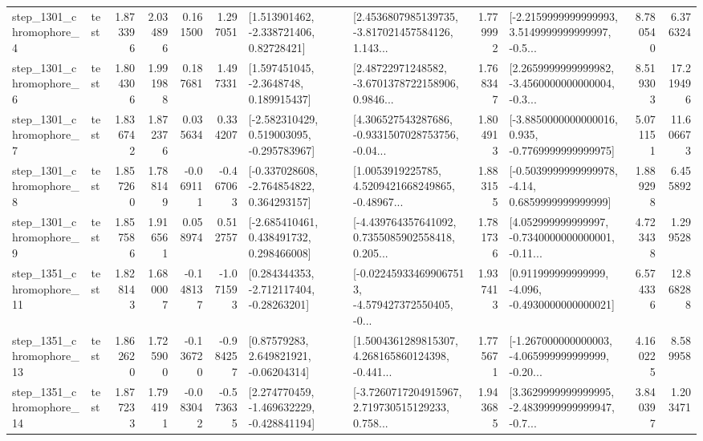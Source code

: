 \begin{tabular}{llrrrrllrlrr}
  step\_1301\_chromophore\_4 &      test &      1.873396 &    2.034896 &      0.161500 &  1.297051 &     [1.513901462, -2.338721406, 0.82728421] &  [2.4536807985139735, -3.817021457584126, 1.143... &       1.779992 &  [-2.2159999999999993, 3.5149999999999997, -0.5... &            8.780540 &          6.376324 \\
  step\_1301\_chromophore\_6 &      test &      1.804306 &    1.991988 &      0.187681 &  1.497331 &      [1.597451045, -2.3648748, 0.189915437] &  [2.48722971248582, -3.6701378722158906, 0.9846... &       1.768347 &  [2.2659999999999982, -3.4560000000000004, -0.3... &            8.519303 &         17.219496 \\
  step\_1301\_chromophore\_7 &      test &      1.836742 &    1.872376 &      0.035634 &  0.334207 &   [-2.582310429, 0.519003095, -0.295783967] &  [4.306527543287686, -0.9331507028753756, -0.04... &       1.804913 &  [-3.8850000000000016, 0.935, -0.7769999999999975] &            5.071151 &         11.606673 \\
  step\_1301\_chromophore\_8 &      test &      1.857260 &    1.788149 &     -0.069111 & -0.467063 &   [-0.337028608, -2.764854822, 0.364293157] &  [1.0053919225785, 4.5209421668249865, -0.48967... &       1.883155 &   [-0.5039999999999978, -4.14, 0.6859999999999999] &            1.889298 &          6.455892 \\
  step\_1301\_chromophore\_9 &      test &      1.857586 &    1.916561 &      0.058974 &  0.512757 &    [-2.685410461, 0.438491732, 0.298466008] &  [-4.439764357641092, 0.7355085902558418, 0.205... &       1.781736 &  [4.052999999999997, -0.7340000000000001, -0.11... &            4.723438 &          1.299528 \\
 step\_1351\_chromophore\_11 &      test &      1.828143 &    1.680007 &     -0.148137 & -1.071593 &    [0.284344353, -2.712117404, -0.28263201] &  [-0.022459334699067513, -4.579427372550405, -0... &       1.937413 &   [0.911999999999999, -4.096, -0.4930000000000021] &            6.574336 &         12.868288 \\
 step\_1351\_chromophore\_13 &      test &      1.862620 &    1.725900 &     -0.136720 & -0.984257 &      [0.87579283, 2.649821921, -0.06204314] &  [1.5004361289815307, 4.268165860124398, -0.441... &       1.775671 &  [-1.267000000000003, -4.065999999999999, -0.20... &            4.160225 &          8.589958 \\
 step\_1351\_chromophore\_14 &      test &      1.877233 &    1.794191 &     -0.083042 & -0.573635 &   [2.274770459, -1.469632229, -0.428841194] &  [-3.7260717204915967, 2.719730515129233, 0.758... &       1.943685 &  [3.3629999999999995, -2.4839999999999947, -0.7... &            3.840397 &          1.203471 \\

\end{tabular}
